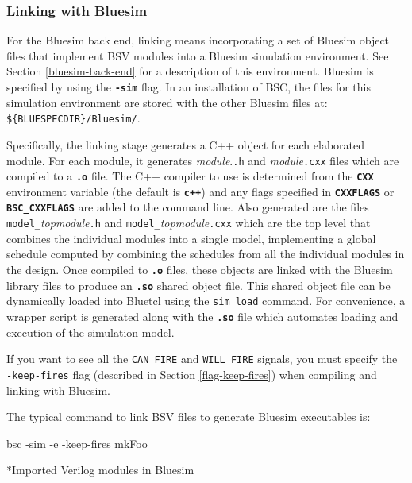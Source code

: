 \documentclass{article}
\makeatletter
\newcommand{\te}[1]{\texttt{#1}}
\newenvironment{centerboxverbatim}
  {\center
   \boxedverbatim}
  {\endboxedverbatim
  {\endcenter }}
\def\subsubsubsection{\@startsection {subsubsubsection}{4}{\z@}{-3ex plus -1ex minus -.2ex}{1.25ex plus .2ex}{\normalsize\bf}*}
\makeatother
\begin{document}

\subsubsection{Linking with Bluesim}

For the Bluesim back end, linking means incorporating a set of Bluesim object
files that implement BSV modules into a Bluesim simulation
environment.  See Section \ref{bluesim-back-end} for a description of this
environment.  Bluesim is specified by using the {\bf\tt -sim} flag.
In an installation of BSC, the files for
this simulation environment are stored with the other Bluesim files
at: \verb|${BLUESPECDIR}/Bluesim/|.

Specifically, the linking stage generates a C++ object for each
elaborated module.  For each module, it generates {\em module}.\te{.h} and
{\em module}\te{.cxx} files which are compiled to a {\bf\tt .o} file.
The C++ compiler to use is determined from the {\bf\tt CXX}
environment variable (the default is {\bf\tt c++}) and any flags
specified in {\bf\tt CXXFLAGS} or {\bf\tt BSC\_CXXFLAGS} are added to
the command line.
Also generated are the files \te{model\_}{\em topmodule}\te{.h} and
\te{model\_}{\em topmodule}\te{.cxx} which are the top level that combines
the individual modules into a single model,
implementing a global schedule computed by combining the schedules from
all the individual modules in the design.
Once compiled to {\bf\tt .o} files, these objects are linked with
the Bluesim library files to produce an {\bf\tt .so} shared object
file.  This shared object file can be dynamically loaded into Bluetcl
using the {\tt sim load} command.  For convenience, a wrapper script
is generated along with the {\bf\tt .so} file which automates loading
and execution of the simulation model.

If you want to see all the \te{CAN\_FIRE} and \te{WILL\_FIRE} signals,
you must specify the \te{-keep-fires} flag (described in Section
\ref{flag-keep-fires})  when compiling and linking
with Bluesim.

The typical command to link  BSV files to generate    Bluesim
executables is:

\begin{centerboxverbatim}
bsc -sim -e -keep-fires mkFoo
\end{centerboxverbatim}


\subsubsubsection{Imported Verilog modules in Bluesim}
\label{importV-bluesim}
\end{document}
